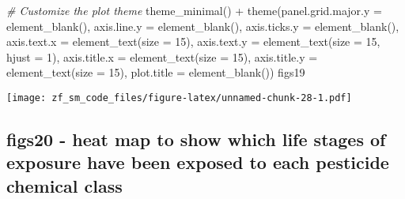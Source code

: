 \documentclass[
]{article}
\newenvironment{Shaded}{\begin{snugshade}}{\end{snugshade}}
\newcommand{\AttributeTok}[1]{\textcolor[rgb]{0.77,0.63,0.00}{#1}}
\newcommand{\CommentTok}[1]{\textcolor[rgb]{0.56,0.35,0.01}{\textit{#1}}}
\newcommand{\DecValTok}[1]{\textcolor[rgb]{0.00,0.00,0.81}{#1}}
\newcommand{\FunctionTok}[1]{\textcolor[rgb]{0.00,0.00,0.00}{#1}}
\newcommand{\NormalTok}[1]{#1}
\newcommand{\SpecialCharTok}[1]{\textcolor[rgb]{0.00,0.00,0.00}{#1}}
\begin{document}
\begin{Shaded}
\begin{Highlighting}[]
  \CommentTok{\# Customize the plot theme}
  \FunctionTok{theme\_minimal}\NormalTok{() }\SpecialCharTok{+}
  \FunctionTok{theme}\NormalTok{(}\AttributeTok{panel.grid.major.y =} \FunctionTok{element\_blank}\NormalTok{(),}
    \AttributeTok{axis.line.y =} \FunctionTok{element\_blank}\NormalTok{(),}
    \AttributeTok{axis.ticks.y =} \FunctionTok{element\_blank}\NormalTok{(),}
    \AttributeTok{axis.text.x =} \FunctionTok{element\_text}\NormalTok{(}\AttributeTok{size =} \DecValTok{15}\NormalTok{),}
    \AttributeTok{axis.text.y =} \FunctionTok{element\_text}\NormalTok{(}\AttributeTok{size =} \DecValTok{15}\NormalTok{, }\AttributeTok{hjust =} \DecValTok{1}\NormalTok{),}
    \AttributeTok{axis.title.x =} \FunctionTok{element\_text}\NormalTok{(}\AttributeTok{size =} \DecValTok{15}\NormalTok{),}
    \AttributeTok{axis.title.y =} \FunctionTok{element\_text}\NormalTok{(}\AttributeTok{size =} \DecValTok{15}\NormalTok{),}
    \AttributeTok{plot.title =} \FunctionTok{element\_blank}\NormalTok{())}
\NormalTok{figs19}
\end{Highlighting}
\end{Shaded}

\texttt{[image: zf\_sm\_code\_files/figure-latex/unnamed-chunk-28-1.pdf]}

\hypertarget{figs20---heat-map-to-show-which-life-stages-of-exposure-have-been-exposed-to-each-pesticide-chemical-class}{%
\subsection{figs20 - heat map to show which life stages of exposure have
been exposed to each pesticide chemical
class}\label{figs20---heat-map-to-show-which-life-stages-of-exposure-have-been-exposed-to-each-pesticide-chemical-class}}
\end{document}
